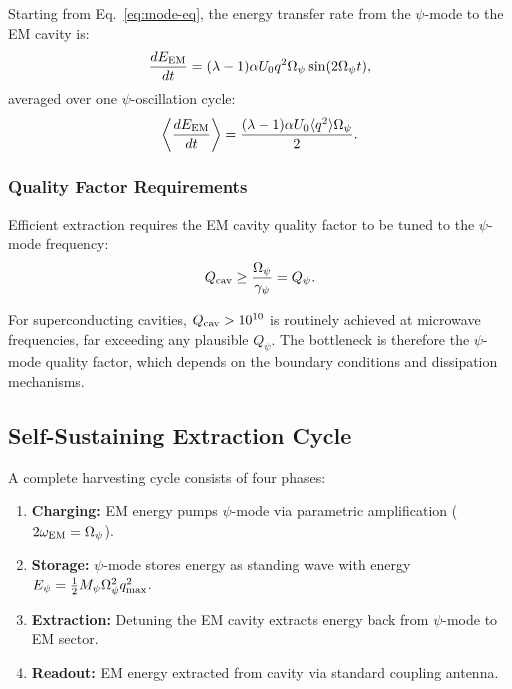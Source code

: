 \documentclass[aps,prd,twocolumn,showpacs,preprintnumbers,superscriptaddress,nofootinbib]{revtex4-2}
\begin{document}
Starting from Eq.~\eqref{eq:mode-eq}, the energy transfer rate from the
$\psi$-mode to the EM cavity is:
\begin{equation}\label{eq:extraction-rate}
\frac{dE_{\rm EM}}{dt} = (\lambda-1)\alpha U_0 q^2\Omega_\psi\sin(2\Omega_\psi t),
\end{equation}
averaged over one $\psi$-oscillation cycle:
\begin{equation}\label{eq:avg-extraction}
\left\langle\frac{dE_{\rm EM}}{dt}\right\rangle = \frac{(\lambda-1)\alpha U_0\langle q^2\rangle\Omega_\psi}{2}.
\end{equation}

\subsubsection{Quality Factor Requirements}

Efficient extraction requires the EM cavity quality factor to be tuned
to the $\psi$-mode frequency:
\begin{equation}
Q_{\rm cav} \geq \frac{\Omega_\psi}{\gamma_\psi} = Q_\psi.
\end{equation}

For superconducting cavities, $Q_{\rm cav} > 10^{10}$ is routinely
achieved at microwave frequencies, far exceeding any plausible $Q_\psi$.
The bottleneck is therefore the $\psi$-mode quality factor, which depends
on the boundary conditions and dissipation mechanisms.

\subsection{Self-Sustaining Extraction Cycle}\label{sec:cycle}

A complete harvesting cycle consists of four phases:

\begin{enumerate}
\item \textbf{Charging:} EM energy pumps $\psi$-mode via parametric
amplification ($2\omega_{\rm EM} = \Omega_\psi$).
\item \textbf{Storage:} $\psi$-mode stores energy as standing wave with
energy $E_\psi = \frac{1}{2}M_\psi\Omega_\psi^2 q_{\rm max}^2$.
\item \textbf{Extraction:} Detuning the EM cavity extracts energy back
from $\psi$-mode to EM sector.
\item \textbf{Readout:} EM energy extracted from cavity via standard
coupling antenna.
\end{enumerate}
\end{document}
